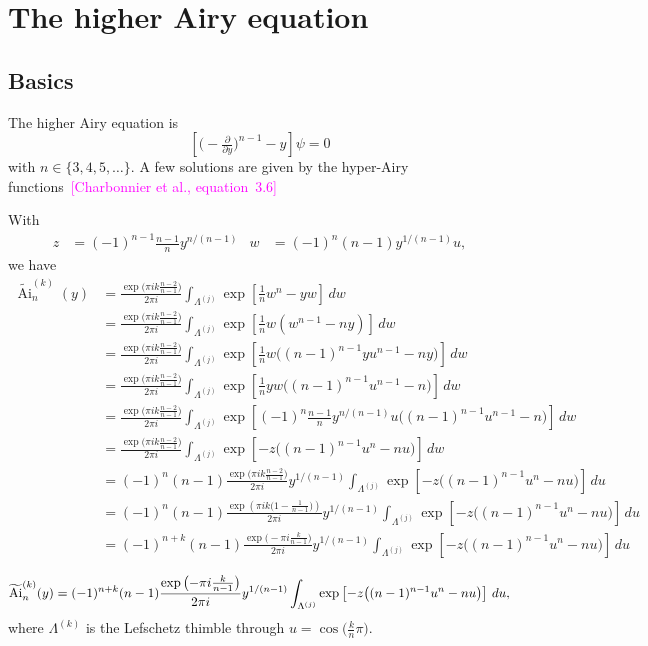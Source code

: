 \documentclass{article}
\theoremstyle{plain}
\DeclareMathOperator{\Ai}{Ai}
\begin{document}
\section{The higher Airy equation}
\subsection{Basics}
The higher Airy equation is
\begin{equation}\label{eqn:airy-lucas}
\left[\big({-}\tfrac{\partial}{\partial y}\big)^{n-1} - y\right] \psi = 0
\end{equation}
with $n \in \{3, 4, 5, \ldots\}$. A few solutions are given by the hyper-Airy functions~\textcolor{magenta}{[Charbonnier et al., equation~3.6]}

\color{Peru}
With
\begin{align*}
z & = (-1)^{n-1} \tfrac{n-1}{n} y^{n/(n-1)} & w & = (-1)^n (n-1) y^{1/(n-1)} u,
\end{align*}
we have
\begin{align*}
\widetilde{\Ai}^{(k)}_n(y) & = \frac{\exp\big(\pi ik \tfrac{n-2}{n-1}\big)}{2\pi i} \int_{\Lambda^{(j)}} \exp\left[\tfrac{1}{n}w^n - yw\right]\,dw \\
& = \frac{\exp\big(\pi ik \tfrac{n-2}{n-1}\big)}{2\pi i} \int_{\Lambda^{(j)}} \exp\left[\tfrac{1}{n}w \left(w^{n-1} - ny\right)\right]\,dw \\
& = \frac{\exp\big(\pi ik \tfrac{n-2}{n-1}\big)}{2\pi i} \int_{\Lambda^{(j)}} \exp\left[\tfrac{1}{n}w \big((n-1)^{n-1} yu^{n-1} - ny\big)\right]\,dw \\
& = \frac{\exp\big(\pi ik \tfrac{n-2}{n-1}\big)}{2\pi i} \int_{\Lambda^{(j)}} \exp\left[\tfrac{1}{n}yw \big((n-1)^{n-1} u^{n-1} - n\big)\right]\,dw \\
& = \frac{\exp\big(\pi ik \tfrac{n-2}{n-1}\big)}{2\pi i} \int_{\Lambda^{(j)}} \exp\left[(-1)^n \tfrac{n-1}{n} y^{n/(n-1)} u\big((n-1)^{n-1} u^{n-1} - n\big)\right]\,dw \\
& = \frac{\exp\big(\pi ik \tfrac{n-2}{n-1}\big)}{2\pi i} \int_{\Lambda^{(j)}} \exp\left[-z\big((n-1)^{n-1} u^n - nu\big)\right]\,dw \\
& = (-1)^n (n-1) \frac{\exp\big(\pi ik \tfrac{n-2}{n-1}\big)}{2\pi i} y^{1/(n-1)}\int_{\Lambda^{(j)}} \exp\left[-z\big((n-1)^{n-1} u^n - nu\big)\right]\,du \\
& = (-1)^n (n-1) \frac{\exp\left(\pi ik \big(1 - \tfrac{1}{n-1}\big)\right)}{2\pi i} y^{1/(n-1)}\int_{\Lambda^{(j)}} \exp\left[-z\big((n-1)^{n-1} u^n - nu\big)\right]\,du \\
& = (-1)^{n+k} (n-1) \frac{\exp\big({-}\pi i \tfrac{k}{n-1}\big)}{2\pi i} y^{1/(n-1)}\int_{\Lambda^{(j)}} \exp\left[-z\big((n-1)^{n-1} u^n - nu\big)\right]\,du \\
\end{align*}
\color{black}
\[ \widetilde{\Ai}^{(k)}_n(y) = (-1)^{n+k} (n-1) \frac{\exp\big({-}\pi i \tfrac{k}{n-1}\big)}{2\pi i} y^{1/(n-1)}\int_{\Lambda^{(j)}} \exp\left[-z\big((n-1)^{n-1} u^n - nu\big)\right]\,du \\, \]
where $\Lambda^{(k)}$ is the Lefschetz thimble through $u = \cos\big(\tfrac{k}{n}\pi\big)$.
\end{document}
